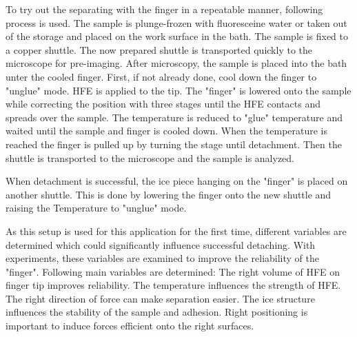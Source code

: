 To try out the separating with the finger in a repeatable manner, following process is used. The sample is plunge-frozen with fluoresceine water or taken out of the storage and placed on the work surface in the bath. The sample is fixed to a copper shuttle. The now prepared shuttle is transported quickly to the microscope for pre-imaging. After microscopy, the sample is placed into the bath unter the cooled finger. First, if not already done, cool down the finger to "unglue" mode. HFE is applied to the tip. The "finger" is lowered onto the sample while correcting the position with three stages until the HFE contacts and spreads over the sample. The temperature is reduced to "glue" temperature and waited until the sample and finger is cooled down. When the temperature is reached the finger is pulled up by turning the stage until detachment. Then the shuttle is transported to the microscope and the sample is analyzed.

When detachment is successful, the ice piece hanging on the "finger" is placed on another shuttle. This is done by lowering the finger onto the new shuttle and raising the Temperature to "unglue" mode.

As this setup is used for this application for the first time, different variables are determined which could significantly influence successful detaching. With experiments, these variables are examined to improve the reliability of the "finger". Following main variables are determined: The right volume of HFE on finger tip improves reliability. The temperature influences the strength of HFE. The right direction of force can make separation easier. The ice structure influences the stability of the sample and adhesion. Right positioning is important to induce forces efficient onto the right surfaces.